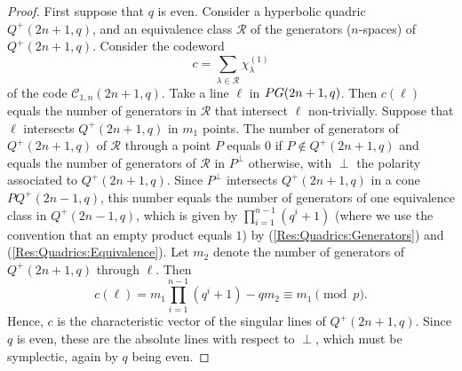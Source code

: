 \documentclass[10pt,a4paper]{amsart}
\newcommand{\mc}{\mathcal C}
\newcommand{\mq}{%
 Q}
\newcommand{\mr}{\mathcal R}
\newcommand{\old}[1]{}%
\newcommand{\pg}{\textnormal{PG}}
\newcommand{\set}[1]{ \left \{ #1 \right \} }
\begin{document}
\begin{proof}
 \old{First suppose that $q$ is even.
 Consider a hyperbolic quadric $\mq^+(3,q)$, and a regulus $\mathcal R$ of lines contained in $\mq^+(3,q)$.
 Consider the codeword 
 \[
  c = \sum_{\ell \in \mathcal R} \chi_\ell
 \]
 of the code $C(q)$.
 Each point of $\mq^+(3,q)$ is contained in a unique line of $\mathcal R$.
 Take a line $\ell$ in $\pg(3,q)$.
 If $\ell$ intersects $\mq^+(3,q)$ in $k \in \set{0,1,2}$ points, then clearly $c\cdot \chi_\ell = k$.
 Otherwise, $\ell$ is completely contained in $\mq^+(3,q)$.
 Either $\ell$ belongs to $\mathcal R$, and $c\cdot \chi_\ell = 1$, or $\ell$ belongs to the opposite regulus and $c\cdot \chi_\ell = q+1 = 1$.
 Hence, $c$ is the characteristic vector of the singular lines of $\mq^+(3,q)$.
 Since $q$ is even, these are the absolute lines with respect to the polarity corresponding to $\mq^+(3,q)$, which must be symplectic, again by $q$ being even.}

 First suppose that $q$ is even.
 Consider a hyperbolic quadric $\mq^+(2n+1,q)$, and an equivalence class $\mathcal R$ of the generators (\(n\)-spaces) of $\mq^+(2n+1,q)$.
 Consider the codeword 
 \[
  c = \sum_{\lambda\in \mathcal R} \chi^{(1)}_{\lambda}
 \]
 of the code $\mc_{1,n}(2n+1,q)$.
 Take a line $\ell$ in $\pg(2n+1,q)$.
 Then $c(\ell)$ equals the number of generators in $\mr$ that intersect $\ell$ non-trivially.
 Suppose that $\ell$ intersects $Q^+(2n+1,q)$ in $m_1$ points.
 The number of generators of $Q^+(2n+1,q)$ of $\mr$ through a point $P$ equals 0 if $P \notin Q^+(2n+1,q)$ and equals the number of generators of $\mr$ in $P^\perp$ otherwise, with $\perp$ the polarity associated to $Q^+(2n+1,q)$.
 Since $P^\perp$ intersects $Q^+(2n+1,q)$ in a cone $P Q^+(2n-1,q)$, this number equals the number of generators of one equivalence class in $Q^+(2n-1,q)$, which is given by $\prod_{i=1}^{n-1} (q^i+1)$ (where we use the convention that an empty product equals $1$) by  (\ref{Res:Quadrics:Generators}) and (\ref{Res:Quadrics:Equivalence}).
 Let $m_2$ denote the number of generators of $Q^+(2n+1,q)$ through $\ell$.
 Then
 \[
  c(\ell) = m_1 \prod_{i=1}^{n-1} (q^i + 1) - q m_2 \equiv m_1 \pmod p.
 \]
 Hence, $c$ is the characteristic vector of the singular lines of $Q^+(2n+1,q)$.
 Since $q$ is even, these are the absolute lines with respect to $\perp$, which must be symplectic, again by $q$ being even.
 

\end{proof}
\end{document}
